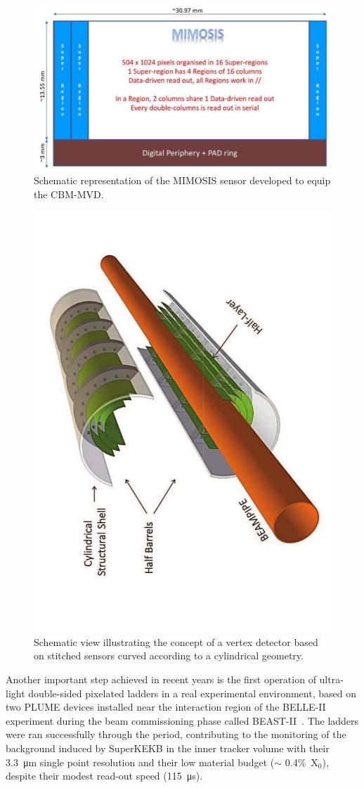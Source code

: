  \begin{figure}
	\centering
	\includegraphics[width=.7\linewidth]{VertexDetector/CMOS/CHG-slide4.pdf}
	\caption{Schematic representation of the MIMOSIS sensor developed to equip the CBM-MVD.}
	\label{fig:VertexDetector:CMOS:MIMOSIS}
\end{figure}
\begin{figure}
	\centering
	\includegraphics[angle=270, width=.5\linewidth]{VertexDetector/CMOS/ALICE-Vertex-Stitched.pdf}
    \caption{Schematic view illustrating the concept of a vertex detector based on stitched sensors curved according to a cylindrical geometry.}
	\label{fig:VertexDetector:CMOS:stitching}
\end{figure}

Another important step achieved in recent years is the first operation 
of ultra-light double-sided pixelated ladders in a real experimental 
environment, based on two PLUME devices installed near the interaction 
region of the BELLE-II experiment during the beam commissioning phase 
called BEAST-II~\cite{CUESTA2020163862}. The ladders were ran successfully 
through the period, contributing to the monitoring of the background 
induced by SuperKEKB in the inner tracker volume with their \SI{3.3}{\micro\meter}
single point resolution and their low material budget ($\sim$ \mbox{0.4\% X$_0$}),
despite their modest read-out speed (\SI{115}{\micro\second}).   


